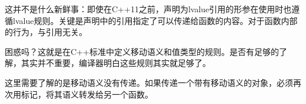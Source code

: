 这并不是什么新鲜事：即使在C++11之前，声明为lvalue引用的形参在使用时也遵循lvalue规则。关键是声明中的引用指定了可以传递给函数的内容。对于函数内部的行为，与引用无关。

困惑吗？这就是在C++标准中定义移动语义和值类型的规则。是否有足够的了解，其实并不重要，编译器明白这些规则其实就足够了。

这里需要了解的是移动语义没有传递。如果传递一个带有移动语义的对象，必须再次用标记，将其语义转发给另一个函数。











































